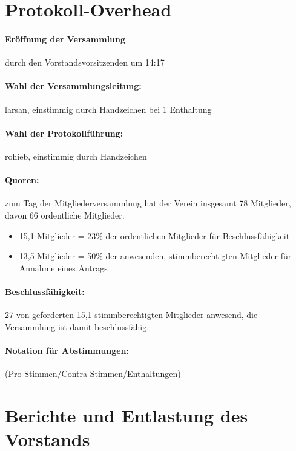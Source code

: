 \documentclass[parskip=half-]{s0minutes}
\begin{document}
\maketitle

\section{Protokoll-Overhead}
\paragraph{Eröffnung der Versammlung} durch den Vorstandsvorsitzenden um 14:17
\paragraph{Wahl der Versammlungsleitung:} larsan, einstimmig durch Handzeichen
	bei 1 Enthaltung
\paragraph{Wahl der Protokollführung:} rohieb, einstimmig durch Handzeichen
\paragraph{Quoren:} zum Tag der Mitgliederversammlung hat der Verein insgesamt 78
	Mitglieder, davon 66 ordentliche Mitglieder.
	\begin{itemize}
		\item 15{,}1 Mitglieder = 23\% der ordentlichen Mitglieder für
			Beschlussfähigkeit
		\item 13{,}5 Mitglieder = 50\% der anwesenden, stimmberechtigten Mitglieder
			für Annahme eines Antrags
	\end{itemize}
\paragraph{Beschlussfähigkeit:} 27 von geforderten 15{,}1 stimmberechtigten
Mitglieder anwesend, die Versammlung ist damit beschlussfähig.
\paragraph{Notation für Abstimmungen:} (Pro-Stimmen/Contra-Stimmen/Enthaltungen)

\section{Berichte und Entlastung des Vorstands}
\end{document}

